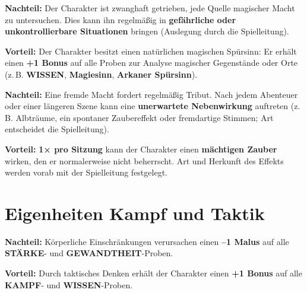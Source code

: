 \begin{traitbox}{}
	
	\textbf{Nachteil:}  
	Der Charakter ist zwanghaft getrieben, jede Quelle magischer Macht zu untersuchen.
	Dies kann ihn regelmäßig in \textbf{gefährliche oder unkontrollierbare Situationen}
	bringen (Auslegung durch die Spielleitung).
	
	\medskip
	\textbf{Vorteil:}  
	Der Charakter besitzt einen natürlichen magischen Spürsinn:
	Er erhält einen \textbf{+1 Bonus} auf alle Proben zur Analyse magischer
	Gegenstände oder Orte
	(z.\,B. \textbf{WISSEN}, \textbf{Magiesinn}, \textbf{Arkaner Spürsinn}).
	
\end{traitbox}

\begin{traitbox}{}
	
	\textbf{Nachteil:}  
	Eine fremde Macht fordert regelmäßig Tribut.
	Nach jedem Abenteuer oder einer längeren Szene kann eine
	\textbf{unerwartete Nebenwirkung} auftreten
	(z.\,B. Albträume, ein spontaner Zaubereffekt oder fremdartige Stimmen;
	Art entscheidet die Spielleitung).
	
	\medskip
	\textbf{Vorteil:}  
	\textbf{1× pro Sitzung} kann der Charakter einen \textbf{mächtigen Zauber}
	wirken, den er normalerweise nicht beherrscht.
	Art und Herkunft des Effekts werden vorab mit der Spielleitung festgelegt.
	
\end{traitbox}

\section{Eigenheiten Kampf und Taktik}

\begin{traitbox}{}
	
	\textbf{Nachteil:}  
	Körperliche Einschränkungen verursachen einen
	\textbf{–1 Malus} auf alle \textbf{STÄRKE}- und \textbf{GEWANDTHEIT}-Proben.
	
	\medskip
	\textbf{Vorteil:}  
	Durch taktisches Denken erhält der Charakter einen
	\textbf{+1 Bonus} auf alle \textbf{KAMPF}- und \textbf{WISSEN}-Proben.
	
\end{traitbox}

